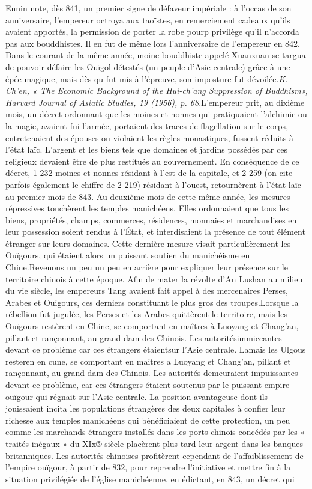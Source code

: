 \item Ennin note, dès 841, un premier signe de défaveur impériale : à l'occas de son anniversaire, l'empereur octroya aux taoïstes, en remerciement cadeaux qu'ils avaient apportés, la permission de porter la robe pourp privilège qu'il n'accorda pas aux bouddhistes. Il en fut de même lors l'anniversaire de l'empereur en 842. Dans le courant de la même année, moine bouddhiste appelé Xuanxuan se targua de pouvoir défaire les Ouïgol détestés (un peuple d'Asie centrale) grâce à une épée magique, mais dès qu fut mis à l'épreuve, son imposture fut dévoilée.\textit{K. Ch'en, « The Economic Background of the Hui-ch'ang Suppression of Buddhism», Harvard Journal of Asiatic Studies, 19 (1956), p. 68}.L'empereur prit, au dixième mois, un décret ordonnant que les moines et nonnes qui pratiquaient l'alchimie ou la magie, avaient fui l'armée, portaient des traces de flagellation sur le corps, entretenaient des épouses ou violaient les règles monastiques, fussent réduits à l'état laïc. L'argent et les biens tels que domaines et jardins possédés par ces religieux devaient être de plus restitués au gouvernement. En conséquence de ce décret, 1 232 moines et nonnes résidant à l'est de la capitale, et 2 259 (on cite parfois également le chiffre de 2 219) résidant à l'ouest, retournèrent à l'état laïc au premier mois de 843. Au deuxième mois de cette même année, les mesures répressives touchèrent les temples manichéens. Elles ordonnaient que tous les biens, propriétés, champs, commerces, résidences, monnaies et marchandises en leur possession soient rendus à l'État, et interdisaient la présence de tout élément étranger sur leurs domaines. Cette dernière mesure visait particulièrement les Ouïgours, qui étaient alors un puissant soutien du manichéisme en Chine.Revenons un peu un peu en arrière pour expliquer leur présence sur le territoire chinois à cette époque. Afin de mater la révolte d'An Lushan au milieu du vie siècle, les empereurs Tang avaient fait appel à des mercenaires Perses, Arabes et Ouigours, ces derniers constituant le plus gros des troupes.Lorsque la rébellion fut jugulée, les Perses et les Arabes quittèrent le territoire, mais les Ouïgours restèrent en Chine, se comportant en maîtres à Luoyang et Chang'an, pillant et rançonnant, au grand dam des Chinois. Les autoritésimmiccantes devant ce problème car ces étrangers étaientsur l'Asie centrale. Lamais les Ulgous resteren en cune, se comportant en maitres a Luoyang et Chang'an, pillant et rançonnant, au grand dam des Chinois. Les autorités demeuraient impuissantes devant ce problème, car ces étrangers étaient soutenus par le puissant empire ouïgour qui régnait sur l'Asie centrale. La position avantageuse dont ils jouissaient incita les populations étrangères des deux capitales à confier leur richesse aux temples manichéens qui bénéficiaient de cette protection, un peu comme les marchands étrangers installés dans les ports chinois concédés par les « traités inégaux » du XIx® siècle placèrent plus tard leur argent dans les banques britanniques. Les autorités chinoises profitèrent cependant de l'affaiblissement de l'empire ouïgour, à partir de 832, pour reprendre l'initiative et mettre fin à la situation privilégiée de l'église manichéenne, en édictant, en 843, un décret qui 